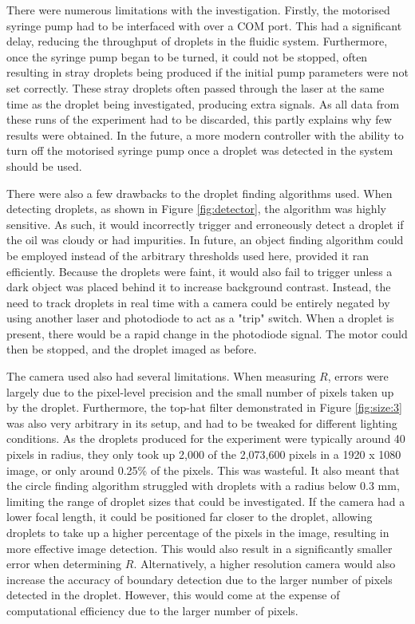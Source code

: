 \documentclass{physics_article_B}
\begin{document}
    There were numerous limitations with the investigation. Firstly, the motorised syringe pump had to be interfaced with over a COM port. This had a significant delay, reducing the throughput of droplets in the fluidic system. Furthermore, once the syringe pump began to be turned, it could not be stopped, often resulting in stray droplets being produced if the initial pump parameters were not set correctly. These stray droplets often passed through the laser at the same time as the droplet being investigated, producing extra signals. As all data from these runs of the experiment had to be discarded, this partly explains why few results were obtained. In the future, a more modern controller with the ability to turn off the motorised syringe pump once a droplet was detected in the system should be used.
    
    There were also a few drawbacks to the droplet finding algorithms used. When detecting droplets, as shown in Figure \ref{fig:detector}, the algorithm was highly sensitive. As such, it would incorrectly trigger and erroneously detect a droplet if the oil was cloudy or had impurities. In future, an object finding algorithm could be employed instead of the arbitrary thresholds used here, provided it ran efficiently. Because the droplets were faint, it would also fail to trigger unless a dark object was placed behind it to increase background contrast. Instead, the need to track droplets in real time with a camera could be entirely negated by using another laser and photodiode to act as a "trip" switch. When a droplet is present, there would be a rapid change in the photodiode signal. The motor could then be stopped, and the droplet imaged as before.
    
    The camera used also had several limitations. When measuring $R$, errors were largely due to the pixel-level precision and the small number of pixels taken up by the droplet. Furthermore, the top-hat filter demonstrated in Figure \ref{fig:size:3} was also very arbitrary in its setup, and had to be tweaked for different lighting conditions. As the droplets produced for the experiment were typically around 40 pixels in radius, they only took up 2,000 of the 2,073,600 pixels in a 1920 x 1080 image, or only around 0.25\% of the pixels. This was wasteful. It also meant that the circle finding algorithm struggled with droplets with a radius below 0.3 mm, limiting the range of droplet sizes that could be investigated. If the camera had a lower focal length, it could be positioned far closer to the droplet, allowing droplets to take up a higher percentage of the pixels in the image, resulting in more effective image detection. This would also result in a significantly smaller error when determining $R$. Alternatively, a higher resolution camera would also increase the accuracy of boundary detection due to the larger number of pixels detected in the droplet. However, this would come at the expense of computational efficiency due to the larger number of pixels. 
    
\end{document}
